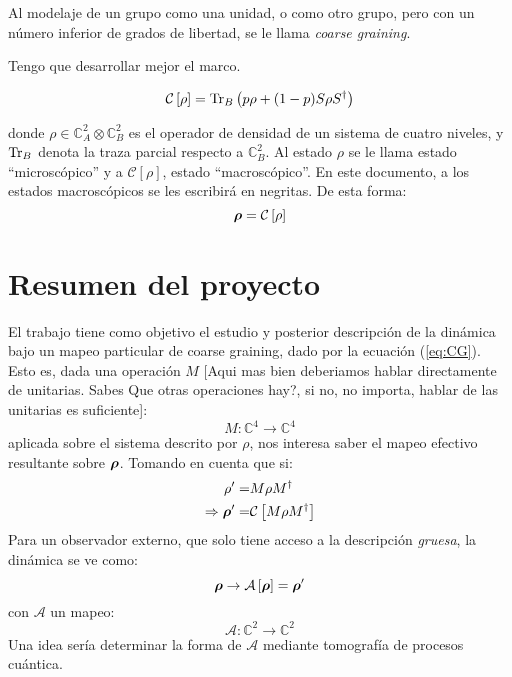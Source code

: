\documentclass[onecolumn,11pt]{article}
\newcommand{\Cc}{\mathcal{C}} %
\newcommand{\Hh}{\mathbb{C}} %
\newcommand{\CG}[1]{\Cc\left[#1\right]}
\newcommand*{\B}[1]{\ifmmode\bm{#1}\else\textbf{#1}\fi}
\newcommand{\nota}[1]{{\color{red} [#1]}}
\begin{document}
Al modelaje de un grupo como una unidad, o como otro grupo, pero con un número inferior de grados de libertad, se le llama \textit{coarse graining}.


Tengo que desarrollar mejor el marco.

\begin{equation}\label{eq:CG}
    \Cc\left[\rho\right]=\Tr_{B}\left(p\rho+(1-p)S\rho S^{\dag}\right)
\end{equation}

donde $\rho\in \Hh^{2}_{A}\otimes \Hh^{2}_{B}$ es el operador de densidad de un sistema de cuatro niveles, y $\Tr_{B}$ denota la traza parcial respecto a $\Hh^{2}_{B}$. Al estado $\rho$ se le llama estado ``microscópico'' y a $\CG{\rho}$, estado ``macroscópico''. En este documento, a los estados macroscópicos se les escribirá en negritas. De esta forma:
\begin{equation}
    \B{\rho}=\CG{\rho}
\end{equation}

\vspace{0.5cm}
\section{Resumen del proyecto}

El trabajo tiene como objetivo el estudio y posterior descripción de la dinámica bajo un mapeo particular de coarse graining, dado por la ecuación (\ref{eq:CG}). Esto es, dada una operación $M$ \nota{Aqui mas bien deberiamos hablar directamente de unitarias. Sabes Que otras operaciones hay?, si no, no importa, hablar de las unitarias es suficiente}:
\begin{equation}
    M:\Hh^{4}\rightarrow\Hh^{4}
\end{equation}
aplicada sobre el sistema descrito por $\rho$, nos interesa saber el mapeo efectivo resultante sobre $\B{\rho}$. Tomando en cuenta que si:
\begin{align}
    \rho'=&M\rho M^{\dag}\\
    \Rightarrow \B{\rho}'=&\CG{M\rho M^{\dag}}
\end{align}
Para un observador externo, que solo tiene acceso a la descripción \textit{gruesa}, la dinámica se ve como:
\begin{equation}\label{eq:obs}
    \B{\rho}\rightarrow\mathcal{A}\left[\B{\rho}\right]=\B{\rho}'
\end{equation}
con $\mathcal{A}$ un mapeo:
\begin{equation}
    \mathcal{A}:\Hh^{2}\rightarrow\Hh^{2}
\end{equation}
Una idea sería determinar la forma de $\mathcal{A}$ mediante tomografía de procesos cuántica. 
\end{document}
